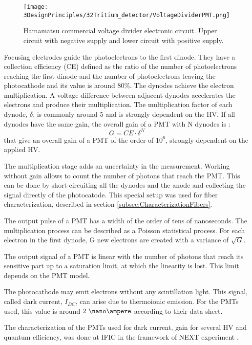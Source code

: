 \begin{enumerate}
\begin{figure}[h]
\centering
\texttt{[image: 3DesignPrinciples/32Tritium\_detector/VoltageDividerPMT.png]}
\caption{Hamamatsu commercial voltage divider electronic circuit. Upper circuit with negative supply and lower circuit with positive supply.\label{fig:VoltageDividerCircuit}~\cite{DataSheetPMTs}}
\end{figure}


Focusing electrodes guide the photoelectrons to the first dinode. They have a collection efficiency (CE) defined as the ratio of the number of photoelectrons reaching the first dinode and the number of photoelectrons leaving the photocathode and its value is around $80\%$. The dynodes achieve the electron multiplication. A voltage difference between adjacent dynodes accelerates the electrons and produce their multiplication. The multiplication factor of each dynode, $\delta$, is commonly around 5 and is strongly dependent on the HV. If all dynodes have the same gain, the overall gain of a PMT with N dynodes is \cite{Knoll}:
\begin{equation}
G = CE\cdot{} \delta^N
\label{eq:PMTGain}
\end{equation}
that give an overall gain of a PMT of the order of $10^6$, strongly dependent on the applied HV.

The multiplication stage adds an uncertainty in the measurement. Working without gain allows to count the number of photons that reach the PMT. This can be done by short-circuiting all the dynodes and the anode and collecting the signal directly of the photocatode. This special setup was used for fiber characterization, described in section \ref{subsec:CharacterizationFibers}.

\end{enumerate}

The output pulse of a PMT has a width of the order of tens of nanoseconds. The multiplication process can be described as a Poisson statistical process. For each electron in the first dynode, G new electrons are created with a variance of $\sqrt{G}$.

The output signal of a PMT is linear with the number of photons that reach its sensitive part up to a saturation limit, at which the linearity is lost. This limit depends on the PMT model.

The photocathode may emit electrons without any scintillation light. This signal, called dark current, $I_{DC}$, can  arise due to thermoionic emission. For the PMTs used, this value is around $2~\nano\ampere$ according to their data sheet.

The characterization of the PMTs used for dark current, gain for several HV and quantum efficiency,  was done at IFIC in the framework of NEXT experiment \cite{CalibrationPMTsNEXT}. 